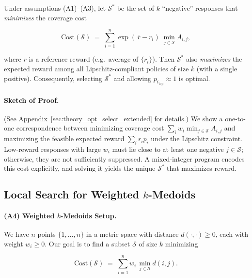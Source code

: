 \begin{theorem}
\label{thm:opt_select_main}
Under assumptions (A1)--(A3), let $\mathcal{S}^*$ be the set of $k$ “negative” responses that \emph{minimizes} the coverage cost

\vspace{-0.2in}
\begin{equation}
      \mathrm{Cost}(\mathcal{S})
  \;=\;
  \sum_{i=1}^n
    \exp(\,\overline{r}-r_i)
    \;\min_{j\in \mathcal{S}}
       A_{i,j},
\end{equation}

where $\overline{r}$ is a reference reward (e.g.\ average of $\{r_i\}$). Then $\mathcal{S}^*$ also \emph{maximizes} the expected reward among all Lipschitz-compliant policies of size $k$ (with a single positive). Consequently, selecting $\mathcal{S}^*$ and allowing $p_{i_{\mathrm{top}}} \approx 1$ is optimal.
\end{theorem}

\paragraph{Sketch of Proof.}
(See Appendix~\ref{sec:theory_opt_select_extended} for details.) We show a one-to-one correspondence between minimizing coverage cost $\sum_i w_i \min_{j\in \mathcal{S}} A_{i,j}$ and maximizing the feasible expected reward $\sum_i r_i p_i$ under the Lipschitz constraint. Low-reward responses with large $w_i$ must lie close to at least one negative $j\in \mathcal{S}$; otherwise, they are not sufficiently suppressed. A mixed-integer program encodes this cost explicitly, and solving it yields the unique $\mathcal{S}^*$ that maximizes reward.

\subsection{Local Search for Weighted $k$-Medoids}
\label{subsec:local_search_statement}

\paragraph{(A4) Weighted $k$-Medoids Setup.}
We have $n$ points $\{1,\dots,n\}$ in a metric space with distance $d(\cdot,\cdot)\ge0$, each with weight $w_i\ge0$. Our goal is to find a subset $\mathcal{S}$ of size $k$ minimizing 

\vspace{-0.2in}
\[
  \mathrm{Cost}(\mathcal{S})
  \;=\;
  \sum_{i=1}^n
    w_i
    \,\min_{j\in \mathcal{S}}
       d(i,j).
\]

